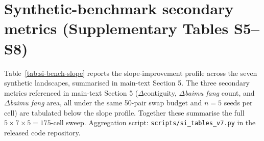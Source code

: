 \documentclass[11pt]{article}
\begin{document}
\section{Synthetic-benchmark secondary metrics (Supplementary Tables S5--S8)}\label{si:s3-bench-secondary}

Table~\ref{tab:si-bench-slope} reports the slope-improvement profile across the seven synthetic landscapes, summarised in main-text Section 5. The three secondary metrics referenced in main-text Section 5 ($\Delta$contiguity, $\Delta$\textit{baimu fang} count, and $\Delta$\textit{baimu fang} area, all under the same 50-pair swap budget and $n{=}5$ seeds per cell) are tabulated below the slope profile. Together these summarise the full $5 \times 7 \times 5 = 175$-cell sweep. Aggregation script: \texttt{scripts/si\_tables\_v7.py} in the released code repository.
\end{document}
